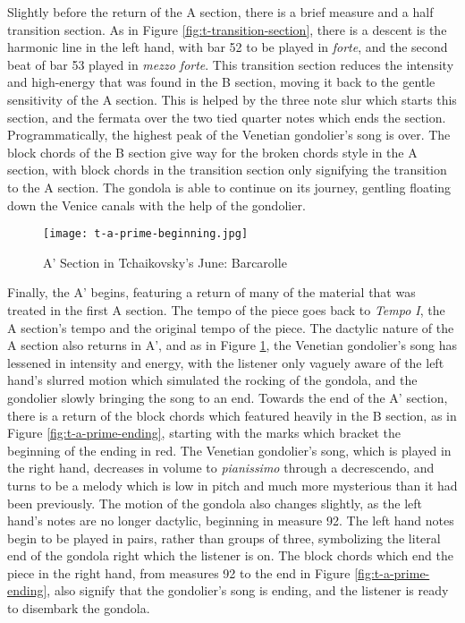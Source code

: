 Slightly before the return of the A section, there is a brief measure and a half transition section. As in Figure \ref{fig:t-transition-section}\autocite{Henle_2002}, there is a descent is the harmonic line in the left hand, with bar 52 to be played in \textit{forte}, and the second beat of bar 53 played in \textit{mezzo forte}. This transition section reduces the intensity and high-energy that was found in the B section, moving it back to the gentle sensitivity of the A section. This is helped by the three note slur which starts this section, and the fermata over the two tied quarter notes which ends the section. Programmatically, the highest peak of the Venetian gondolier's song is over. The block chords of the B section give way for the broken chords style in the A section, with block chords in the transition section only signifying the transition to the A section. The gondola is able to continue on its journey, gentling floating down the Venice canals with the help of the gondolier.

\begin{figure}
  \centering
  \texttt{[image: t-a-prime-beginning.jpg]}
  \caption{A' Section in Tchaikovsky's June: Barcarolle}
  \label{fig:t-a-prime-beginning}
\end{figure}


Finally, the A' begins, featuring a return of many of the material that was treated in the first A section. The tempo of the piece goes back to \textit{Tempo I}, the A section's tempo and the original tempo of the piece. The dactylic nature of the A section also returns in A', and as in Figure \ref{fig:t-a-prime-beginning}\autocite{Henle_2002}, the Venetian gondolier's song has lessened in intensity and energy, with the listener only vaguely aware of the left hand's slurred motion which simulated the rocking of the gondola, and the gondolier slowly bringing the song to an end. Towards the end of the A' section, there is a return of the block chords which featured heavily in the B section, as in Figure \ref{fig:t-a-prime-ending}\autocite{Henle_2002}, starting with the marks which bracket the beginning of the ending in red. The Venetian gondolier's song, which is played in the right hand, decreases in volume to \textit{pianissimo} through a decrescendo, and turns to be a melody which is low in pitch and much more mysterious than it had been previously. The motion of the gondola also changes slightly, as the left hand's notes are no longer dactylic, beginning in measure 92. The left hand notes begin to be played in pairs, rather than groups of three, symbolizing the literal end of the gondola right which the listener is on. The block chords which end the piece in the right hand, from measures 92 to the end in Figure \ref{fig:t-a-prime-ending}\autocite{Henle_2002}, also signify that the gondolier's song is ending, and the listener is ready to disembark the gondola.

